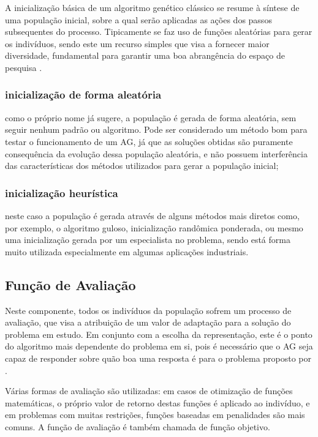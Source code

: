 A inicialização básica de um algoritmo genético clássico se resume à síntese de uma população inicial, sobre a qual serão aplicadas as ações dos passos subsequentes do processo. Tipicamente se faz uso de funções aleatórias para gerar os indivíduos, sendo este um recurso simples que visa a fornecer maior diversidade, fundamental para garantir uma boa abrangência do espaço de pesquisa \cite{goldberg02}. 

\subsubsection{inicialização de forma aleatória}

como o próprio nome já sugere, a população é gerada de forma aleatória, sem seguir nenhum padrão ou algoritmo. Pode ser considerado um método bom para testar o funcionamento de um AG, já que as soluções obtidas são puramente consequência da evolução dessa população aleatória, e não possuem interferência das características dos métodos utilizados para gerar a população inicial;

\subsubsection{inicialização heurística}

neste caso a população é gerada através de alguns métodos mais diretos como, por exemplo, o algoritmo guloso, inicialização randômica ponderada, ou mesmo uma inicialização gerada por um especialista no problema, sendo está forma muito utilizada especialmente em algumas aplicações industriais.

\subsection{Função de Avaliação}


Neste componente, todos os indivíduos da população sofrem um processo de avaliação, que visa a atribuição de um valor de adaptação para a solução do problema em estudo. Em conjunto com a escolha da representação, este é o ponto do algoritmo mais dependente do problema em si, pois é necessário que o AG seja capaz de responder sobre quão boa uma resposta é para o problema proposto por \cite{goldberg02}. 

Várias formas de avaliação são utilizadas: em casos de otimização de funções matemáticas, o próprio valor de retorno destas funções é aplicado ao indivíduo, e em problemas com muitas restrições, funções baseadas em penalidades são mais comuns. A função de avaliação é também chamada de função objetivo. 


